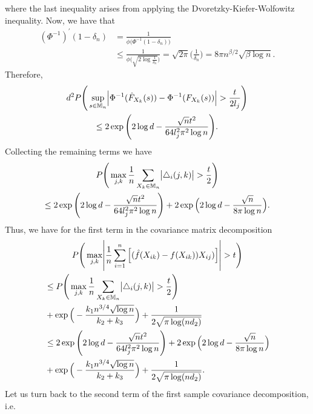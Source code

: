 where the last inequality arises from applying the Dvoretzky-Kiefer-Wolfowitz inequality. Now, we have that
\begin{align*}
    (\Phi^{-1})^{'}(1-\delta_n) & = \frac{1}{\phi\big(\Phi^{-1}(1-\delta_n)\big)}                                                                                             \\
                                & \leq \frac{1}{\phi\Big(\sqrt{2\log\frac{1}{\delta_n}}\Big)} = \sqrt{2\pi}\Big(\frac{1}{\delta_n}\Big) = 8\pi n^{\beta/2}\sqrt{\beta\log n}.
\end{align*}
Therefore,
\begin{multline*}
    d^2P\Bigg(\sup_{s \in \mathbb{M}_n} \abs{\Phi^{-1}(\hat{F}_{X_k}(s)) - \Phi^{-1}(F_{X_k}(s))} > \frac{t}{2l_{j}}\Bigg) \\
    \leq 2\exp\Bigg(2\log d - \frac{\sqrt{n}t^2}{64 l_{j}^2 \pi^2 \log n}\Bigg).
\end{multline*}
Collecting the remaining terms we have
\begin{multline*}
    P\Bigg(\max_{j,k} \frac{1}{n} \sum_{X_k \in \mathbb{M}_n} \abs{\bigtriangleup_i(j,k)} > \frac{t}{2}\Bigg) \\%
    \leq 2\exp\Bigg(2\log d - \frac{\sqrt{n}t^2}{64 l_{j}^2 \pi^2 \log n}\Bigg)
    + 2\exp\Big(2\log d - \frac{\sqrt{n}}{8\pi\log n}\Big).
\end{multline*}
Thus, we have for the first term in the covariance matrix decomposition
\begin{multline*}
    P\Bigg(\max_{j,k}\abs{\frac{1}{n}\sum_{i=1}^n \Big[(\hat{f}(X_{ik}) - f(X_{ik}))X_{ij})\Big]} > t \Bigg) \\
    \begin{aligned}
         & \leq P\Bigg(\max_{j,k} \frac{1}{n} \sum_{X_k \in \mathbb{M}_n} \abs{\bigtriangleup_i(j,k)} > \frac{t}{2}\Bigg)                     \\
         & + \exp\Big(- \frac{k_1 n^{3/4} \sqrt{\log n}}{k_2+ k_3} \Big) + \frac{1}{2\sqrt{\pi \log(nd_2)}}                                   \\
         & \leq 2\exp\Bigg(2\log d - \frac{\sqrt{n}t^2}{64 l_{j}^2 \pi^2 \log n}\Bigg) + 2\exp\Big(2\log d - \frac{\sqrt{n}}{8\pi\log n}\Big) \\
         & + \exp\Big(- \frac{k_1 n^{3/4} \sqrt{\log n}}{k_2+ k_3} \Big) + \frac{1}{2\sqrt{\pi \log(nd_2)}}.
    \end{aligned}
\end{multline*}
Let us turn back to the second term of the first sample covariance decomposition, i.e.

